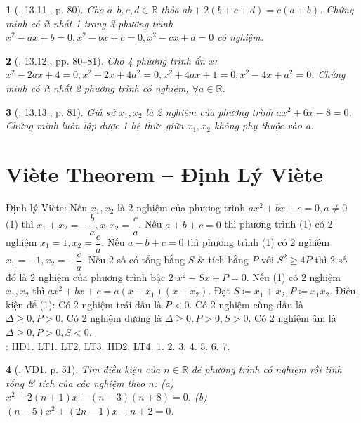 \documentclass{article}
\newtheorem{baitoan}{}
\begin{document}
\begin{baitoan}[\cite{TLCT_THCS_Toan_9_dai_so}, 13.11., p. 80]
	Cho $a,b,c,d\in\mathbb{R}$ thỏa $ab + 2(b + c + d) = c(a + b)$. Chứng minh có ít nhất 1 trong 3 phương trình $x^2 - ax + b = 0,x^2 - bx + c = 0,x^2 - cx + d = 0$ có nghiệm.
\end{baitoan}

\begin{baitoan}[\cite{TLCT_THCS_Toan_9_dai_so}, 13.12., pp. 80--81]
	Cho 4 phương trình ẩn $x$: $x^2 - 2ax + 4 = 0,x^2 + 2x + 4a^2 = 0,x^2 + 4ax + 1 = 0,x^2 - 4x + a^2 = 0$. Chứng minh có ít nhất 2 phương trình có nghiệm, $\forall a\in\mathbb{R}$.
\end{baitoan}

\begin{baitoan}[\cite{TLCT_THCS_Toan_9_dai_so}, 13.13., p. 81]
	Giả sử $x_1,x_2$ là 2 nghiệm của phương trình $ax^2 + 6x - 8 = 0$. Chứng minh luôn lập được 1 hệ thức giữa $x_1,x_2$ không phụ thuộc vào a.
\end{baitoan}


\section{Vi\`ete Theorem -- Định Lý Vi\`ete}
 Định lý Vi\`ete: Nếu $x_1,x_2$ là 2 nghiệm của phương trình $ax^2 + bx + c = 0,a\ne0$ (1) thì $x_1 + x_2 = -\dfrac{b}{a},x_1x_2 = \dfrac{c}{a}$.  Nếu $a + b + c = 0$ thì phương trình (1) có 2 nghiệm $x_1 = 1,x_2 = \dfrac{c}{a}$. Nếu $a - b + c = 0$ thì phương trình (1) có 2 nghiệm $x_1 = -1,x_2 = -\dfrac{c}{a}$.  Nếu 2 số có tổng bằng $S$ \& tích bằng $P$ với $S^2\ge4P$ thì 2 số đó là 2 nghiệm của phương trình bậc 2 $x^2 - Sx + P = 0$.  Nếu (1) có 2 nghiệm $x_1,x_2$ thì $ax^2 + bx + c = a(x - x_1)(x - x_2)$.  Đặt $S\coloneqq x_1 + x_2,P\coloneqq x_1x_2$. Điều kiện để (1): Có 2 nghiệm trái dấu là $P < 0$. Có 2 nghiệm cùng dấu là $\Delta\ge0,P > 0$. Có 2 nghiệm dương là $\Delta\ge0,P > 0,S > 0$. Có 2 nghiệm âm là $\Delta\ge0,P > 0,S < 0$.\\

\noindent\cite[Chap. VII, \S3, pp. 61--65]{SGK_Toan_9_Canh_Dieu_tap_2}: HD1. LT1. LT2. LT3. HD2. LT4. 1. 2. 3. 4. 5. 6. 7.

\begin{baitoan}[\cite{Binh_boi_duong_Toan_9_tap_2}, VD1, p. 51]
	Tìm điều kiện của $n\in\mathbb{R}$ để phương trình có nghiệm rồi tính tổng \& tích của các nghiệm theo $n$: (a) $x^2 - 2(n + 1)x + (n - 3)(n + 8) = 0$. (b) $(n - 5)x^2 + (2n - 1)x + n + 2 = 0$.
\end{baitoan}
\end{document}
